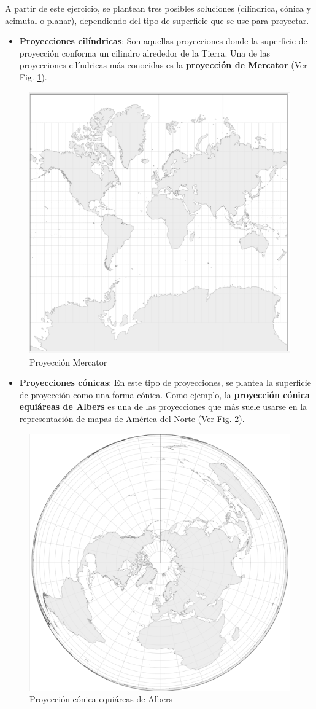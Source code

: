 \documentclass[
]{book}
\providecommand{\tightlist}{%
  \setlength{\itemsep}{0pt}\setlength{\parskip}{0pt}}
\theoremstyle{definition}
\theoremstyle{definition}
\theoremstyle{definition}
\theoremstyle{definition}
\theoremstyle{remark}
\begin{document}
A partir de este ejercicio, se plantean tres posibles soluciones (cilíndrica,
cónica y acimutal o planar), dependiendo del tipo de superficie que se use para
proyectar.

\begin{itemize}
\tightlist
\item
  \textbf{Proyecciones cilíndricas}: Son aquellas proyecciones donde la superficie
  de proyección conforma un cilindro alrededor de la Tierra. Una de las
  proyecciones cilíndricas más conocidas es la \textbf{proyección de Mercator} (Ver
  Fig. \ref{fig:mercator}).
\end{itemize}

\begin{figure}

{\centering \includegraphics[width=0.4\linewidth]{img/mercator} 

}

\caption{Proyección Mercator}\label{fig:mercator}
\end{figure}

\begin{itemize}
\tightlist
\item
  \textbf{Proyecciones cónicas}: En este tipo de proyecciones, se plantea la
  superficie de proyección como una forma cónica. Como ejemplo, la
  \textbf{proyección cónica equiáreas de Albers} es una de las proyecciones que más
  suele usarse en la representación de mapas de América del Norte (Ver Fig.
  \ref{fig:albers}).
\end{itemize}

\begin{figure}

{\centering \includegraphics[width=0.4\linewidth]{img/albers_conic} 

}

\caption{Proyección cónica equiáreas de Albers}\label{fig:albers}
\end{figure}
\end{document}

